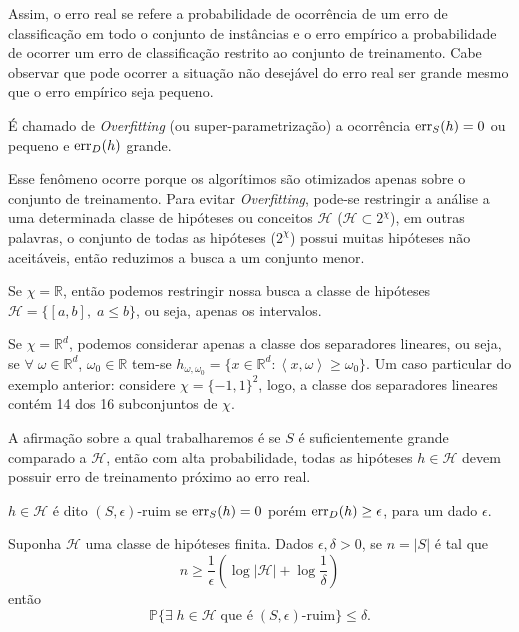 Assim, o erro real se refere a probabilidade de ocorrência de um erro de classificação em todo o conjunto de instâncias e o erro empírico a probabilidade de ocorrer um erro de classificação restrito ao conjunto de treinamento. Cabe observar que pode ocorrer a situação não desejável do erro real ser grande mesmo que o erro empírico seja pequeno.


\begin{definicao}
É chamado de \emph{Overfitting} (ou super-parametrização) a ocorrência $\operatorname{err}_S(h) = 0$ ou pequeno e $\operatorname{err}_D(h)$ grande.
\end{definicao}{}

Esse fenômeno ocorre porque os algorítimos são otimizados apenas sobre o conjunto de treinamento.
Para evitar \emph{Overfitting}, pode-se restringir a análise a uma determinada classe de hipóteses ou conceitos $\mathcal{H}$ ($\mathcal{H} \subset 2^\chi$), em outras palavras, o conjunto de todas as hipóteses ($2^\chi$) possui muitas hipóteses não aceitáveis, então reduzimos a busca a um conjunto menor.

\begin{exemplo}
Se $\chi = \mathbb{R}$, então podemos restringir nossa busca a classe de hipóteses $\mathcal{H} = \{[a,b],\;a\leq b\}$, ou seja, apenas os intervalos.
\end{exemplo}{}

\begin{exemplo}
Se $\chi = \mathbb{R}^d$,  podemos considerar apenas a classe dos separadores lineares, ou seja, se $\forall \; \omega \in \mathbb{R}^d$, $\omega_0 \in \mathbb{R}$ tem-se $h_{\omega, \omega_0} = \{x \in \mathbb{R}^d : \left< x, \omega\right> \geq \omega_0\}$. Um caso particular do exemplo anterior: considere $\chi = \{-1,1\}^2$, logo, a classe dos separadores lineares contém 14 dos 16 subconjuntos de $\chi$.
\end{exemplo}{}

A afirmação sobre a qual trabalharemos é se $S$ é suficientemente grande comparado a $\mathcal{H}$, então com alta probabilidade, todas as hipóteses $h \in \mathcal{H}$ devem possuir erro de treinamento próximo ao erro real.

\begin{definicao}
$h \in \mathcal{H}$ é dito $(S, \epsilon)\text{-ruim}$ se $\operatorname{err}_S(h) = 0$ porém $\operatorname{err}_D(h) \geq \epsilon$, para um dado $\epsilon$.
\end{definicao}{}

\begin{teorema}
\label{teorema_ap_mq_0}
Suponha $\mathcal{H}$ uma classe de hipóteses finita. Dados  $\epsilon, \delta > 0$, se $n = |S|$ é tal que
\begin{equation*}
n \geq \frac{1}{\epsilon}\left(\log{|\mathcal{H}|} + \log{\frac{1}{\delta}}\right)
\end{equation*}{}
então
\begin{equation*}
    \mathbb{P} \{\exists \; h \in \mathcal{H} \; \text{que é} \; (S, \epsilon)\text{-ruim}\} \leq \delta.
\end{equation*}{}
\end{teorema}


